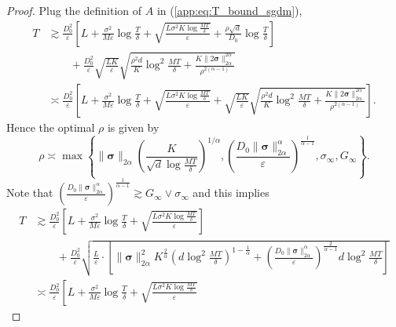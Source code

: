 \documentclass{article} %
\numberwithin{equation}{section}
\renewcommand{\eqref}[1]{(\ref{#1})}
\begin{document}
\begin{proof}
    Plug the definition of $A$ in \eqref{app:eq:T_bound_sgdm},
    \begin{equation}
        \begin{aligned}
            T
            &\gtrsim \frac{D_0^2}{\varepsilon}\left[L+\frac{\sigma^2}{M \varepsilon}\log\frac{T}{\delta}+\sqrt{\frac{L\sigma^2K\log\frac{MT}{\delta}}{\varepsilon}}+\frac{\rho\sqrt{d}}{D_0}\log\frac{T}{\delta}\right] \\
            &\qquad + \frac{D_0^2}{\varepsilon}\sqrt{\frac{LK}{\varepsilon}} \sqrt{\frac{\rho^2d}{K}\log^2\frac{MT}{\delta}+\frac{K\|2\boldsymbol{\sigma}\|_{2\alpha}^{2\alpha}}{\rho^{2(\alpha-1)}}} \\
            &\asymp \frac{D_0^2}{\varepsilon}\left[L+\frac{\sigma^2}{M \varepsilon}\log\frac{T}{\delta}+\sqrt{\frac{L\sigma^2K\log\frac{MT}{\delta}}{\varepsilon}}+\sqrt{\frac{LK}{\varepsilon}} \sqrt{\frac{\rho^2d}{K}\log^2\frac{MT}{\delta}+\frac{K\|2\boldsymbol{\sigma}\|_{2\alpha}^{2\alpha}}{\rho^{2(\alpha-1)}}} \right].
        \end{aligned}
    \end{equation}
    Hence the optimal $\rho$ is given by 
    \begin{equation}
        \rho\asymp \max\left\{\|\boldsymbol{\sigma}\|_{2\alpha}\left(\frac{K}{\sqrt{d}\log\frac{MT}{\delta}}\right)^{1/\alpha}, \left(\frac{D_0\|\boldsymbol{\sigma}\|_{2\alpha}^{\alpha}}{\varepsilon}\right)^{\frac{1}{\alpha-1}}, \sigma_\infty, G_{\infty}\right\}.
    \end{equation}
    Note that $\left(\frac{D_0\|\boldsymbol{\sigma}\|_{2\alpha}^{\alpha}}{\varepsilon}\right)^{\frac{1}{\alpha-1}}\gtrsim G_\infty\vee \sigma_\infty$ and this implies 
    \begin{equation}
        \begin{aligned}
            T
            &\gtrsim \frac{D_0^2}{\varepsilon}\left[L+\frac{\sigma^2}{M \varepsilon}\log\frac{T}{\delta}+\sqrt{\frac{L\sigma^2K\log\frac{MT}{\delta}}{\varepsilon}}\right] \\
            &\qquad + \frac{D_0^2}{\varepsilon}\sqrt{\frac{L}{\varepsilon}\cdot \left[\|\boldsymbol{\sigma}\|_{2\alpha}^2K^{\frac{2}{\alpha}}\left(d\log^2\frac{MT}{\delta}\right)^{1-\frac{1}{\alpha}} + \left(\frac{D_0\|\boldsymbol{\sigma}\|_{2\alpha}^{\alpha}}{\varepsilon}\right)^{\frac{2}{\alpha-1}}d\log^2\frac{MT}{\delta}\right]} \\
            &\asymp \frac{D_0^2}{\varepsilon}\left[L+\frac{\sigma^2}{M \varepsilon}\log\frac{T}{\delta}+\sqrt{\frac{L\sigma^2K\log\frac{MT}{\delta}}{\varepsilon}} 

\end{aligned}
\end{equation}
\end{proof}
\end{document}
